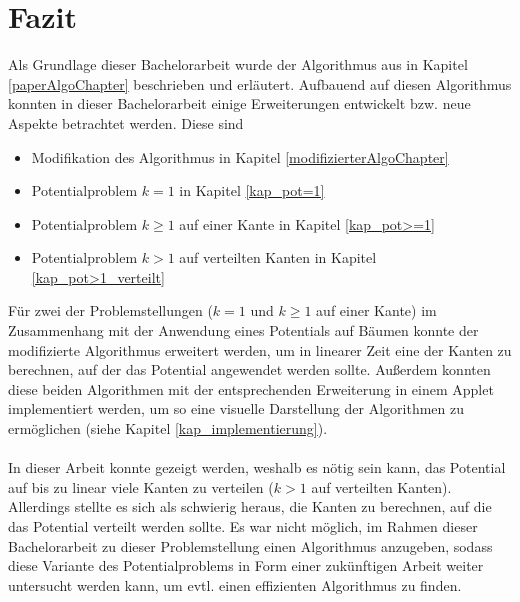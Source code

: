 \section{Fazit}

Als Grundlage dieser Bachelorarbeit wurde der Algorithmus aus \cite{cima_paper} in Kapitel \ref{paperAlgoChapter} beschrieben und erläutert. Aufbauend auf diesen Algorithmus konnten in dieser Bachelorarbeit einige Erweiterungen entwickelt bzw. neue Aspekte betrachtet werden. Diese sind
\begin{itemize}
	\item Modifikation des Algorithmus in Kapitel \ref{modifizierterAlgoChapter}
	\item Potentialproblem $k = 1$ in Kapitel \ref{kap_pot=1}
	\item Potentialproblem $k \geq 1$ auf einer Kante in Kapitel \ref{kap_pot>=1}
	\item Potentialproblem $k > 1$ auf verteilten Kanten in Kapitel \ref{kap_pot>1_verteilt}
\end{itemize}

Für zwei der Problemstellungen ($k = 1$ und $k \geq 1$ auf einer Kante) im Zusammenhang mit der Anwendung eines Potentials auf Bäumen konnte der modifizierte Algorithmus erweitert werden, um in linearer Zeit eine der Kanten zu berechnen, auf der das Potential angewendet werden sollte. Außerdem konnten diese beiden Algorithmen mit der entsprechenden Erweiterung in einem Applet implementiert werden, um so eine visuelle Darstellung der Algorithmen zu ermöglichen (siehe Kapitel \ref{kap_implementierung}). 
\\
\\
In dieser Arbeit konnte gezeigt werden, weshalb es nötig sein kann, das Potential auf bis zu linear viele Kanten zu verteilen ($k > 1$ auf verteilten Kanten). Allerdings stellte es sich als schwierig heraus, die Kanten zu berechnen, auf die das Potential verteilt werden sollte. Es war nicht möglich, im Rahmen dieser Bachelorarbeit zu dieser Problemstellung einen Algorithmus anzugeben, sodass diese Variante des Potentialproblems in Form einer zukünftigen Arbeit weiter untersucht werden kann, um evtl. einen effizienten Algorithmus zu finden.
